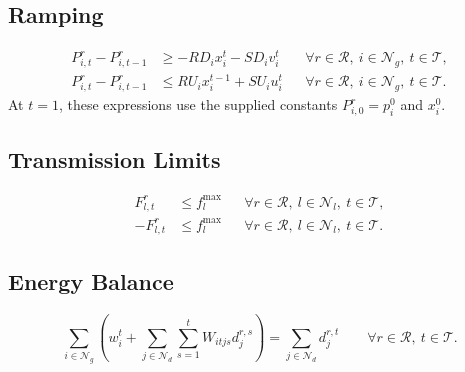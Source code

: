 \documentclass[11pt]{article}
\begin{document}
\subsection{Ramping}

\begin{align}
 P_{i,t}^r-P_{i,t-1}^r&\ge -RD_i x_i^t-SD_i v_i^t
 &&\forall r\in\mathcal R,\ i\in\mathcal N_g,\ t\in\mathcal T,\label{eq:ramp-down}\\
 P_{i,t}^r-P_{i,t-1}^r&\le RU_i x_i^{t-1}+SU_i u_i^t
 &&\forall r\in\mathcal R,\ i\in\mathcal N_g,\ t\in\mathcal T.\label{eq:ramp-up}
\end{align}
At $t=1$, these expressions use the supplied constants $P_{i,0}^r=p_i^0$ and $x_i^0$.

\subsection{Transmission Limits}

\begin{align}
 F_{l,t}^r&\le f_l^{\max}
 &&\forall r\in\mathcal R,\ l\in\mathcal N_l,\ t\in\mathcal T,\label{eq:flow-upper}\\
 -F_{l,t}^r&\le f_l^{\max}
 &&\forall r\in\mathcal R,\ l\in\mathcal N_l,\ t\in\mathcal T.\label{eq:flow-lower}
\end{align}

\subsection{Energy Balance}

\begin{equation}
 \sum_{i\in\mathcal N_g}
 \left(w_i^t+\sum_{j\in\mathcal N_d}\sum_{s=1}^{t}
 W_{itjs}d_j^{r,s}\right)
 =\sum_{j\in\mathcal N_d}d_j^{r,t}
 \qquad\forall r\in\mathcal R,\ t\in\mathcal T.
 \label{eq:balance}
\end{equation}
\end{document}

